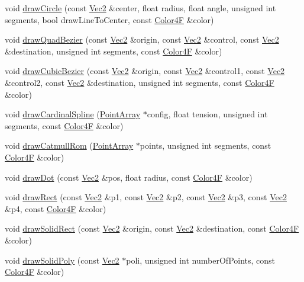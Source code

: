 \begin{DoxyCompactItemize}
void \hyperlink{classDrawNode_af5a7e9947c1048ab5b718c1b5bbca12f}{draw\+Circle} (const \hyperlink{classVec2}{Vec2} \&center, float radius, float angle, unsigned int segments, bool draw\+Line\+To\+Center, const \hyperlink{structColor4F}{Color4F} \&color)
\item 
void \hyperlink{classDrawNode_a16f0f5a0e7825e469c33df8694b51dc6}{draw\+Quad\+Bezier} (const \hyperlink{classVec2}{Vec2} \&origin, const \hyperlink{classVec2}{Vec2} \&control, const \hyperlink{classVec2}{Vec2} \&destination, unsigned int segments, const \hyperlink{structColor4F}{Color4F} \&color)
\item 
void \hyperlink{classDrawNode_a116fefaf98aab7aed0e75e72c4b44851}{draw\+Cubic\+Bezier} (const \hyperlink{classVec2}{Vec2} \&origin, const \hyperlink{classVec2}{Vec2} \&control1, const \hyperlink{classVec2}{Vec2} \&control2, const \hyperlink{classVec2}{Vec2} \&destination, unsigned int segments, const \hyperlink{structColor4F}{Color4F} \&color)
\item 
void \hyperlink{classDrawNode_a3a049a11a464ef816b4e0883a7995f99}{draw\+Cardinal\+Spline} (\hyperlink{classPointArray}{Point\+Array} $\ast$config, float tension, unsigned int segments, const \hyperlink{structColor4F}{Color4F} \&color)
\item 
void \hyperlink{classDrawNode_a0d495593f7877ce67007bc0fea68147a}{draw\+Catmull\+Rom} (\hyperlink{classPointArray}{Point\+Array} $\ast$points, unsigned int segments, const \hyperlink{structColor4F}{Color4F} \&color)
\item 
void \hyperlink{classDrawNode_af88d6e8ceecb345279adc955df8d1220}{draw\+Dot} (const \hyperlink{classVec2}{Vec2} \&pos, float radius, const \hyperlink{structColor4F}{Color4F} \&color)
\item 
void \hyperlink{classDrawNode_a7bfae00862072e6ebbb4529c2a17246e}{draw\+Rect} (const \hyperlink{classVec2}{Vec2} \&p1, const \hyperlink{classVec2}{Vec2} \&p2, const \hyperlink{classVec2}{Vec2} \&p3, const \hyperlink{classVec2}{Vec2} \&p4, const \hyperlink{structColor4F}{Color4F} \&color)
\item 
void \hyperlink{classDrawNode_a4eed155f58988bab43e8d8bc31bf5ccb}{draw\+Solid\+Rect} (const \hyperlink{classVec2}{Vec2} \&origin, const \hyperlink{classVec2}{Vec2} \&destination, const \hyperlink{structColor4F}{Color4F} \&color)
\item 
void \hyperlink{classDrawNode_a577574914623292940783273d1ea6bff}{draw\+Solid\+Poly} (const \hyperlink{classVec2}{Vec2} $\ast$poli, unsigned int number\+Of\+Points, const \hyperlink{structColor4F}{Color4F} \&color)

\end{DoxyCompactItemize}
